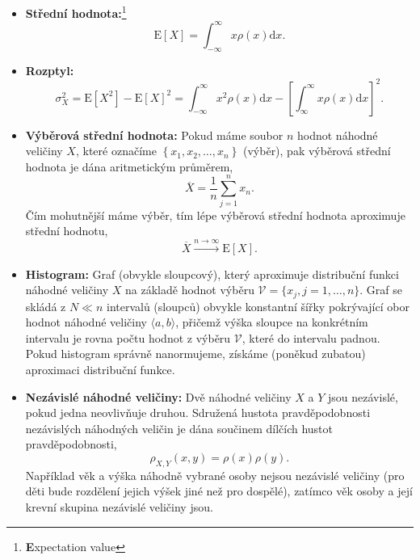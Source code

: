 \documentclass[a4paper,11pt,twoside]{article}
\renewcommand{\d}{\mathrm{d}}           %
\def\expectation#1{\mathrm{E}\left[#1\right]}
\def\dispersion#1{\sigma_{#1}^{2}}
\theoremstyle{red}
\theoremstyle{green}
\begin{document}
\begin{itemize}
            \item {\bf Střední hodnota:}\footnote{{\bf E}xpectation value}
                \begin{equation}
                    \label{eq:Expectation}
                    \expectation{X}=\int_{-\infty}^{\infty}x\rho(x)\d x.
                \end{equation}

            \item {\bf Rozptyl:}
                \begin{equation}
                    \label{eq:Dispersion}
                    \dispersion{X}
                        =\expectation{X^{2}}-\expectation{X}^{2}
                        =\int_{-\infty}^{\infty}x^{2}\rho(x)\d x-\left[\int_{\infty}^{\infty}x\rho(x)\d x\right]^{2}.
                \end{equation}

            \item {\bf Výběrová střední hodnota:} 
                Pokud máme soubor $n$ hodnot náhodné veličiny $X$, které označíme $\left\{x_{1},x_{2},\dotsc,x_{n}\right\}$ (výběr), pak výběrová střední hodnota je dána aritmetickým průměrem,
                \begin{equation}
                    \overline{X}=\frac{1}{n}\sum_{j=1}^{n}x_{n}.
                \end{equation}
                Čím mohutnější máme výběr, tím lépe výběrová střední hodnota aproximuje střední hodnotu,
                \begin{equation}
                    \overline{X}\xrightarrow{n\rightarrow\infty}\expectation{X}.
                \end{equation}

            \item {\bf Histogram:}
                Graf (obvykle sloupcový), který aproximuje distribuční funkci náhodné veličiny $X$ na základě hodnot výběru $\mathcal{V}=\{x_{j},j=1,\dotsc,n\}$.
                Graf se skládá z $N\ll n$ intervalů (sloupců) obvykle konstantní šířky pokrývající obor hodnot náhodné veličiny $\langle a,b\rangle$, přičemž výška sloupce na konkrétním intervalu je rovna počtu hodnot z výběru $\mathcal{V}$, které do intervalu padnou.
                Pokud histogram správně nanormujeme, získáme (poněkud zubatou) aproximaci distribuční funkce.

            \item{\bf Nezávislé náhodné veličiny:}
                Dvě náhodné veličiny $X$ a $Y$ jsou nezávislé, pokud jedna neovlivňuje druhou.
                Sdružená hustota pravděpodobnosti nezávislých náhodných veličin je dána součinem dílčích hustot pravděpodobnosti,
                \begin{equation}
                    \rho_{X,Y}(x,y)=\rho(x)\rho(y).
                \end{equation}
                Například věk a výška náhodně vybrané osoby nejsou nezávislé veličiny (pro děti bude rozdělení jejich výšek jiné než pro dospělé), zatímco věk osoby a její krevní skupina nezávislé veličiny jsou.


\end{itemize}
\end{document}
